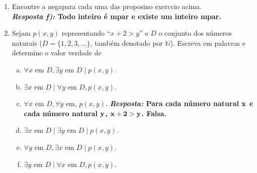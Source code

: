\begin{enumerate}[{\bf 1.}]
\begin{enumerate}[a)]
{\bf{\it Resposta:}  Sejam ${\bf D}$ o conjunto dos n\'umeros inteiros pares, ${\bf p(x,y)}$ ``${\bf x+y}$ pertence \`a D''. Ent\ao a proposi\cao \'e ${\bf \forall x,y \textrm{ em } D, p(x,y)}$.}

\item Todo subconjunto fechado e limitado de $\mathbb{R}$ \'e compacto.

{\bf{\it Resposta:}  Sejam ${\bf D}$ o conjunto dos subconjuntos de $\mathbb{R}$, ${\bf p(x)}$ ``${\bf x}$ \'e fechado'', ${\bf q(x)}$ ``${\bf x}$ \'e limitado'', ${\bf r(x)}$ ``${\bf x}$ \'e compacto''. Ent\ao a proposi\cao \'e \\ ${\bf \forall x \textrm{ em } D, p(x)\ee q(x)\to r(x)}$.}
\end{enumerate}

\item Encontre a nega\cao para cada uma das proposi\coes no exerc\ih cio acima.\\
{\bf{\it Resposta f):} Todo inteiro \'e \ih mpar e existe um inteiro \ih mpar.}\\

\item Sejam $p(x,y)$ representando ``$x+2>y$'' e $D$ o conjunto dos n\'umeros naturais ($D=\{1,2,3,\ldots\}$, tamb\'em denotado por $\mathbb{N}$). Escreva em palavras e determine o valor verdade de
\begin{enumerate}[a)]
\item $\forall x \textrm{ em } D, \exists y \textrm{ em } D \mid  p(x,y)$.
\item $\exists x \textrm{ em } D \mid  \forall y \textrm{ em } D, p(x,y)$.
\item $\forall x \textrm{ em } D, \forall y \textrm{ em, } p(x,y)$. {\bf{\it Resposta:} Para cada n\'umero natural ${\bf x}$ e cada n\'umero natural ${\bf y}$, ${\bf x+2>y}$. Falsa.}
\item $\exists x \textrm{ em } D \mid  \exists y \textrm{ em } D \mid  p(x,y)$.
\item $\forall y \textrm{ em } D, \exists x \textrm{ em } D \mid  p(x,y)$.
\item $\exists y \textrm{ em } D \mid  \forall x \textrm{ em } D, p(x,y)$.
\end{enumerate} 


\end{enumerate}
